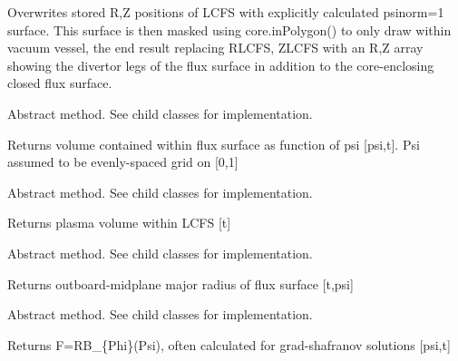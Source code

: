 \documentclass[letterpaper,10pt,english]{sphinxmanual}
\begin{document}
\begin{fulllineitems}
\begin{fulllineitems}
Overwrites stored R,Z positions of LCFS with explicitly calculated psinorm=1
surface.  This surface is then masked using core.inPolygon() to only draw within
vacuum vessel, the end result replacing RLCFS, ZLCFS with an R,Z array showing
the divertor legs of the flux surface in addition to the core-enclosing closed
flux surface.

\end{fulllineitems}


\begin{fulllineitems}
\label{eqtools:eqtools.core.Equilibrium.getFluxVol}
Abstract method.  See child classes for implementation.

Returns volume contained within flux surface as function of psi {[}psi,t{]}.
Psi assumed to be evenly-spaced grid on {[}0,1{]}

\end{fulllineitems}


\begin{fulllineitems}
\label{eqtools:eqtools.core.Equilibrium.getVolLCFS}
Abstract method.  See child classes for implementation.

Returns plasma volume within LCFS {[}t{]}

\end{fulllineitems}


\begin{fulllineitems}
\label{eqtools:eqtools.core.Equilibrium.getRmidPsi}
Abstract method.  See child classes for implementation.

Returns outboard-midplane major radius of flux surface {[}t,psi{]}

\end{fulllineitems}


\begin{fulllineitems}
\label{eqtools:eqtools.core.Equilibrium.getF}
Abstract method.  See child classes for implementation.

Returns F=RB\_\{Phi\}(Psi), often calculated for grad-shafranov solutions  {[}psi,t{]}


\end{fulllineitems}
\end{fulllineitems}
\end{document}
